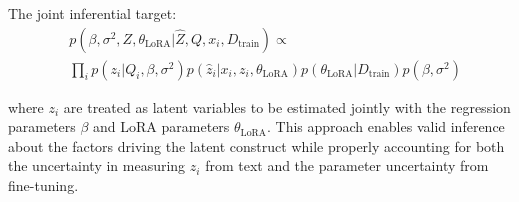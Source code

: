 \documentclass[11pt]{article}
\begin{document}
The joint inferential target:
\begin{align}
&p(\beta, \sigma^2, Z, \theta_{\text{LoRA}}|\hat{Z}, Q, x_i, D_{\text{train}}) \propto \label{eq:joint_target2} \\
&\prod_i p(z_i|Q_i, \beta, \sigma^2)p(\hat{z}_i|x_i, z_i, \theta_{\text{LoRA}})p(\theta_{\text{LoRA}}|D_{\text{train}})p(\beta, \sigma^2) \nonumber
\end{align}

where $z_i$ are treated as latent variables to be estimated jointly with the regression parameters $\beta$ and LoRA parameters $\theta_{\text{LoRA}}$. This approach enables valid inference about the factors driving the latent construct while properly accounting for both the uncertainty in measuring $z_i$ from text and the parameter uncertainty from fine-tuning.
\end{document}

